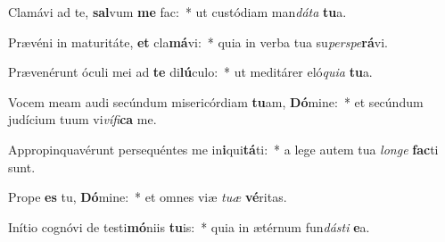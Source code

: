 \item Clamávi ad te, \textbf{sal}vum \textbf{me} fac:~* ut custódiam man\textit{dá}\textit{ta} \textbf{tu}a.
\item Prævéni in maturitáte, \textbf{et} cla\textbf{má}vi:~* quia in verba tua su\textit{per}\textit{spe}\textbf{rá}vi.
\item Prævenérunt óculi mei ad \textbf{te} di\textbf{lú}culo:~* ut meditárer eló\textit{qui}\textit{a} \textbf{tu}a.
\item Vocem meam audi secúndum misericórdiam \textbf{tu}am, \textbf{Dó}mine:~* et secúndum judícium tuum vi\textit{ví}\textit{fi}\textbf{ca} me.
\item Appropinquavérunt persequéntes me in\textbf{i}qui\textbf{tá}ti:~* a lege autem tua \textit{lon}\textit{ge} \textbf{fac}ti sunt.
\item Prope \textbf{es} tu, \textbf{Dó}mine:~* et omnes viæ \textit{tu}\textit{æ} \textbf{vé}ritas.
\item Inítio cognóvi de testi\textbf{mó}niis \textbf{tu}is:~* quia in ætérnum fun\textit{dás}\textit{ti} \textbf{e}a.
